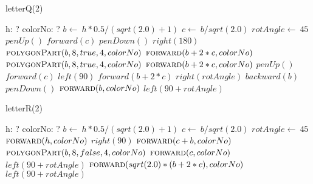 \documentclass[a4paper,10pt]{article}
\begin{document}
\begin{algorithm}
\caption{letterQ(2)}
\begin{algorithmic}[5]
\State {}
\State {}
    \State h: ?
    \State colorNo: ?
  \EndDecl
  \State \(b\gets\ h*0.5/(sqrt(2.0)+1)\)
  \State \(c\gets\ b/sqrt(2.0)\)
  \State \(rotAngle\gets\ 45\)
  \State \(penUp()\)
  \State \(forward(c)\)
  \State \(penDown()\)
  \State \(right(180)\)
  \State {}
  \State {}
  \State \(\Call{polygonPart}{b,8,true,4,colorNo}\)
  \State \(\Call{forward}{b+2*c,colorNo}\)
  \State {}
  \State {}
  \State \(\Call{polygonPart}{b,8,true,4,colorNo}\)
  \State \(\Call{forward}{b+2*c,colorNo}\)
  \State \(penUp()\)
  \State \(forward(c)\)
  \State \(left(90)\)
  \State \(forward(b+2*c)\)
  \State \(right(rotAngle)\)
  \State \(backward(b)\)
  \State \(penDown()\)
  \State \(\Call{forward}{b,colorNo}\)
  \State \(left(90+rotAngle)\)
\EndProcedure
\end{algorithmic}
\end{algorithm}


\begin{algorithm}
\caption{letterR(2)}
\begin{algorithmic}[5]
\State {}
\State {}
    \State h: ?
    \State colorNo: ?
  \EndDecl
  \State \(b\gets\ h*0.5/(sqrt(2.0)+1)\)
  \State \(c\gets\ b/sqrt(2.0)\)
  \State \(rotAngle\gets\ 45\)
  \State \(\Call{forward}{h,colorNo}\)
  \State \(right(90)\)
  \State \(\Call{forward}{c+b,colorNo}\)
  \State {}
  \State {}
  \State \(\Call{polygonPart}{b,8,false,4,colorNo}\)
  \State \(\Call{forward}{c,colorNo}\)
  \State \(left(90+rotAngle)\)
  \State \(\Call{forward}{sqrt(2.0)*(b+2*c),colorNo}\)
  \State \(left(90+rotAngle)\)
\EndProcedure
\end{algorithmic}
\end{algorithm}
\end{document}
